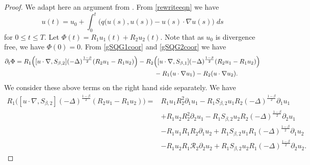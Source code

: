 \documentclass[11pt]{amsart}
\numberwithin{equation}{section}
\begin{document}
\begin{proof}
We adapt here an argument from \cite{inci2015regularity}. From \eqref{rewriteeqn} we have 	
		\[
		u(t) = u_0 + \int_0^t \Big(q\big(u(s),u(s)\big) - u(s) \cdot \nabla u(s) \Big) \; ds
		\]
		 for $0 \leq t \leq T$. Let $\Phi(t)= R_1 u_1(t) +  R_2 u_2(t)$. Note that as $u_0$ is divergence free, we have $\Phi(0)=0$. From \eqref{gSQG1coor} and \eqref{gSQG2coor} we have
		\begin{align*}
			\partial_t \Phi &=  R_1\Big([ u\cdot \nabla,S_{\beta,2}](-\Delta)^{\frac{1-\beta}{2}}(R_2u_1-R_1u_2)\Big) -  R_2\Big([ u\cdot \nabla,S_{\beta,1}](-\Delta)^{\frac{1-\beta}{2}}(R_2u_1-R_1u_2)\Big)\\
			&\hspace{7.6cm} - R_1(u \cdot \nabla u_1)-R_2(u \cdot \nabla u_2).
		\end{align*}
		We consider these above terms on the right hand side separately. We have
		\begin{align*}
			R_1\Big([ u\cdot \nabla,S_{\beta,2}](-\Delta)^{\frac{1-\beta}{2}}(R_2u_1-R_1u_2)\Big)
			=& R_1 u_1  R_{2}^2  \partial_1 u_1 - R_1 S_{\beta,2} u_1 R_2 (-\Delta)^{\frac{1-\beta}{2}}\partial_1 u_1 \\
			& +R_1 u_2  R_{2}^2 \partial_2 u_1  -  R_1 S_{\beta,2} u_2 R_2 (-\Delta)^{\frac{1-\beta}{2}}\partial_2 u_1  \\
			& -R_1 u_1  R_{1} R_{2}  \partial_1 u_2 + R_1 S_{\beta,2} u_1 R_1 (-\Delta)^{\frac{1-\beta}{2}}\partial_1 u_2  \\
			& - R_1  u_2  R_{1} \mathcal R_{2} \partial_2 u_2 + R_1 S_{\beta,2} u_2 R_1 (-\Delta)^{\frac{1-\beta}{2}} \partial_2 u_2.
		\end{align*}


\end{proof}
\end{document}
